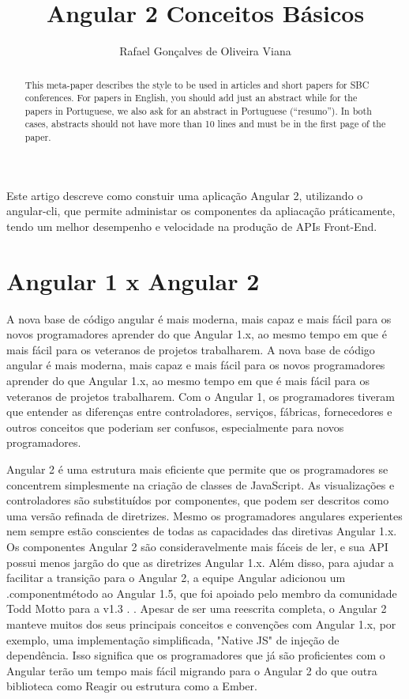 \documentclass[12pt]{article}
\title{Angular 2 Conceitos Básicos}
\author{Rafael Gonçalves de Oliveira Viana\inst{1} }
\begin{document}
 

\maketitle

\begin{abstract}
  This meta-paper describes the style to be used in articles and short papers
  for SBC conferences. For papers in English, you should add just an abstract
  while for the papers in Portuguese, we also ask for an abstract in
  Portuguese (``resumo''). In both cases, abstracts should not have more than
  10 lines and must be in the first page of the paper.
\end{abstract}
     
\begin{resumo} 
  Este artigo descreve como constuir uma aplicação Angular 2, utilizando o angular-cli, que permite administar os componentes da apliacação práticamente, tendo um melhor desempenho e velocidade na produção de APIs Front-End. 
\end{resumo}


\section{Angular 1 x Angular 2}
A nova base de código angular é mais moderna, mais capaz e mais fácil para os novos programadores aprender do que Angular 1.x, ao mesmo tempo em que é mais fácil para os veteranos de projetos trabalharem.
A nova base de código angular é mais moderna, mais capaz e mais fácil para os novos programadores aprender do que Angular 1.x, ao mesmo tempo em que é mais fácil para os veteranos de projetos trabalharem.
Com o Angular 1, os programadores tiveram que entender as diferenças entre controladores, serviços, fábricas, fornecedores e outros conceitos que poderiam ser confusos, especialmente para novos programadores.

Angular 2 é uma estrutura mais eficiente que permite que os programadores se concentrem simplesmente na criação de classes de JavaScript. As visualizações e controladores são substituídos por componentes, que podem ser descritos como uma versão refinada de diretrizes. Mesmo os programadores angulares experientes nem sempre estão conscientes de todas as capacidades das diretivas Angular 1.x. Os componentes Angular 2 são consideravelmente mais fáceis de ler, e sua API possui menos jargão do que as diretrizes Angular 1.x. Além disso, para ajudar a facilitar a transição para o Angular 2, a equipe Angular adicionou um .componentmétodo ao Angular 1.5, que foi apoiado pelo membro da comunidade Todd Motto para a v1.3 .
.
Apesar de ser uma reescrita completa, o Angular 2 manteve muitos dos seus principais conceitos e convenções com Angular 1.x, por exemplo, uma implementação simplificada, "Native JS" de injeção de dependência. Isso significa que os programadores que já são proficientes com o Angular terão um tempo mais fácil migrando para o Angular 2 do que outra biblioteca como Reagir ou estrutura como a Ember.
\end{document}
